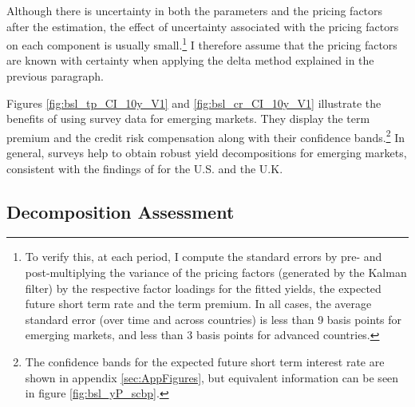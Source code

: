 {%
Although there is uncertainty in both the parameters and the pricing factors after the estimation, the effect of uncertainty associated with the pricing factors on each component is usually small.\footnote{ To verify this, at each period, I compute the standard errors by pre- and post-multiplying the variance of the pricing factors (generated by the Kalman filter) by the respective factor loadings for the fitted yields, the expected future short term rate and the term premium. In all cases, the average standard error (over time and across countries) is less than 9 basis points for emerging markets, and less than 3 basis points for advanced countries.}
I therefore assume that the pricing factors are known with certainty when %
applying the delta method explained in the previous paragraph.

Figures \ref{fig:bsl_tp_CI_10y_V1} and \ref{fig:bsl_cr_CI_10y_V1} illustrate the benefits of using survey data 
for emerging markets.
They display the term premium and the credit risk compensation along with their confidence bands.\footnote{ The confidence bands for the expected future short term interest rate are shown in appendix \ref{sec:AppFigures}, but equivalent information can be seen in figure \ref{fig:bsl_yP_scbp}.}
In general, surveys help to obtain robust yield decompositions for emerging markets, consistent with the findings of \cite{Guimaraes:2014} for the U.S. and the U.K.


\subsection{Decomposition Assessment}
\iftoggle{toclinks}{\gototoc}{} %


%	

}
